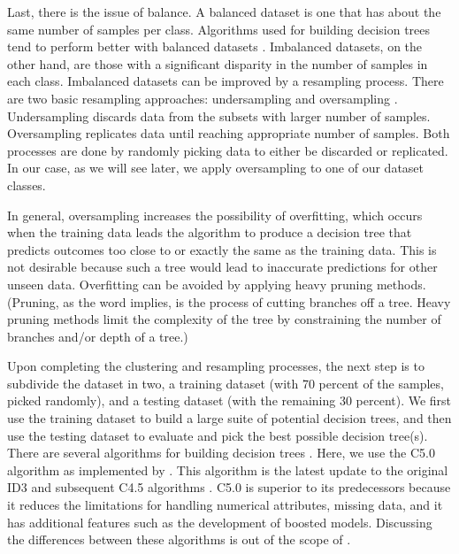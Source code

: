 Last, there is the issue of balance. A balanced dataset is one that has about the same number of samples per class. Algorithms used for building decision trees tend to perform better with balanced datasets \citep[e.g.,][]{Branco_2016_ACMCS, Weiss_2003_JAIR}. Imbalanced datasets, on the other hand, are those with a significant disparity in the number of samples in each class. Imbalanced datasets can be improved by a resampling process. There are two basic resampling approaches: undersampling and oversampling \citep{Branco_2016_ACMCS}. Undersampling discards data from the subsets with larger number of samples. Oversampling replicates data until reaching appropriate number of samples. Both processes are done by randomly picking data to either be discarded or replicated. In our case, as we will see later, we apply oversampling to one of our dataset classes.

In general, oversampling increases the possibility of overfitting, which occurs when the training data leads the algorithm to produce a decision tree that predicts outcomes too close to or exactly the same as the training data. This is not desirable because such a tree would lead to inaccurate predictions for other unseen data. Overfitting can be avoided by applying heavy pruning methods. (Pruning, as the word implies, is the process of cutting branches off a tree. Heavy pruning methods limit the complexity of the tree by constraining the number of branches and/or depth of a tree.)

Upon completing the clustering and resampling processes, the next step is to subdivide the dataset in two, a training dataset (with 70 percent of the samples, picked randomly), and a testing dataset (with the remaining 30 percent). We first use the training dataset to build a large suite of potential decision trees, and then use the testing dataset to evaluate and pick the best possible decision tree(s). There are several algorithms for building decision trees \citep[e.g., ID3, C4.5, C5.0, CART; see][]{Quinlan_1986_ML, Quinlan_1993_Book, Quinlan_1996_JAIR, Breiman_1984_Book}. Here, we use the C5.0 algorithm as implemented by \citet{Kuhn_2017_Manual}. This algorithm is the latest update to the original ID3 and subsequent C4.5 algorithms \citep{Quinlan_1993_Book, Quinlan_1996_JAIR}. C5.0 is superior to its predecessors because it reduces the limitations for handling numerical attributes, missing data, and it has additional features such as the development of boosted models. Discussing the differences between these algorithms is out of the scope of .


